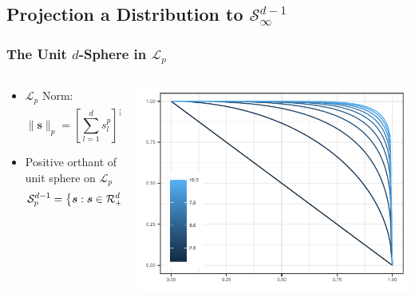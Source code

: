 \documentclass[aspectratio=169]{beamer}
\newlength{\frametextheight}
\begin{document}
\subsection{Projection a Distribution to $\mathcal{S}_{\infty}^{d-1}$}

\begin{frame}
  \frametitle{The Unit $d$-Sphere in $\mathcal{L}_p$}
  \begin{columns}
    \begin{column}{.49\textwidth}
      \begin{itemize}
        \item $\mathcal{L}_p$ Norm:
          \begin{equation*}
            \lVert \bm{s}\rVert_p = \left[\sum_{l = 1}^ds_l^p\right]^{\frac{1}{p}}
          \end{equation*}
        \pause
        \item Positive orthant of unit sphere on $\mathcal{L}_p$
          \begin{equation*}
            \mathcal{S}_{p}^{d-1} = \left\lbrace \bm{s} : 
                \bm{s}\in\mathcal{R}_+^d,\hspace{.2cm} \lVert\bm{s}\rVert_p = 1 \right\rbrace
          \end{equation*}
      \end{itemize}%
      \vfill
      ~
    \end{column}%
    \hfill%
    \begin{column}{.5\textwidth}
      \begin{center}
        \includegraphics[height=\frametextheight, width = \frametextheight]{./images/p_sphere}
      \end{center}
    \end{column}%
  \end{columns}%
\end{frame} %
\end{document}
